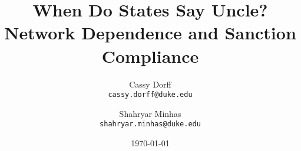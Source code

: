 \documentclass[12pt]{article}
\title{When Do States Say Uncle? Network Dependence and Sanction Compliance}
\author{	Cassy Dorff \\
	\texttt{cassy.dorff@duke.edu}
	\and
	Shahryar Minhas \\
	\texttt{shahryar.minhas@duke.edu}}
\date{\today}
\begin{document}
\maketitle\thispagestyle{empty}

\begin{abstract}

\singlespacing{}

\end{abstract}

\newpage\setcounter{page}{1}













\newpage


\end{document}
